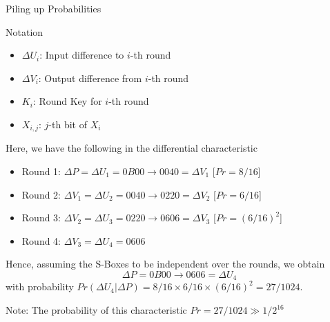 \documentclass[9pt]{beamer}
\begin{document}
\begin{frame}
Piling up Probabilities

\vspace{2mm}
\pause Notation
\begin{itemize}
\item{$\Delta U_i$: Input difference to $i$-th round}
\item{$\Delta V_i$: Output difference from $i$-th round}
\item{$K_i$: Round Key for $i$-th round}
\item{$X_{i,j}$: $j$-th bit of $X_i$}
\end{itemize}

\vspace{2mm}
\pause Here, we have the following in the differential characteristic
\begin{itemize}[<+->]
\item{Round 1: $\Delta P = \Delta U_1 = 0B00 \rightarrow 0040 = \Delta V_1$  [$Pr = 8/16$]}
\item{Round 2: $\Delta V_1 = \Delta U_2 = 0040 \rightarrow 0220 = \Delta V_2$  [$Pr = 6/16$]}
\item{Round 3: $\Delta V_2 = \Delta U_3 = 0220 \rightarrow 0606 = \Delta V_3$  [$Pr = \left(6/16\right)^2$]}
\item{Round 4: $\Delta V_3 = \Delta U_4 = 0606$}
\end{itemize}

\vspace{2mm}
\pause Hence, assuming the S-Boxes to be independent over the rounds, we obtain
\[ \Delta P = 0B00 \rightarrow 0606 = \Delta U_4 \]
with probability $Pr(\Delta U_4 | \Delta P) = 8/16 \times 6/16 \times \left(6/16\right)^2 = 27/1024$.

\vspace{2mm}
\pause Note: The probability of this characteristic $Pr = 27/1024 \gg 1/2^{16}$

\end{frame}
\end{document}
